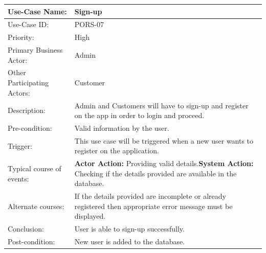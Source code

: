 \begin{center}
    \begin{tabular}{ @{}|p{7cm}||p{7cm}|  }
    \hline
    Use-Case Name: & Sign-up  \\ \hline
    Use-Case ID: & PORS-07 \\ \hline
    Priority: & High \\ \hline
    Primary Business Actor: & Admin \\ \hline
    Other Participating Actors: & Customer \\ \hline
    Description: & Admin and Customers will have to sign-up and register on the app in order to login and proceed. \\ \hline
    Pre-condition: & Valid information by the user. \\ \hline
    Trigger: & This use case will be triggered when a new user wants to register on the application. \\ \hline
    Typical course of events: & \textbf{Actor Action:} \newline Providing valid details.\newline \textbf{System Action:} \newline Checking if the details provided are available in the database.
 \\ \hline
    Alternate courses: & If the details provided are incomplete or already registered then appropriate error message must be displayed. \\ \hline
    Conclusion: &  User is able to sign-up successfully.\\ \hline
    Post-condition: & New user is added to the database. \\ \hline
    \end{tabular}
\end{center}

